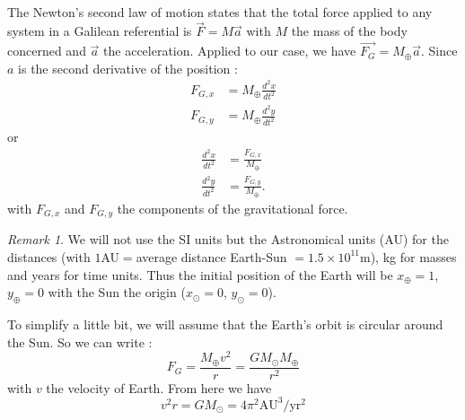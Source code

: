 \documentclass[a4paper, twoside, 11pt]{report}
\theoremstyle{theorem}
\theoremstyle{remark}
\newtheorem{remark}{Remark}[chapter]
\theoremstyle{exemple}
\begin{document}
            \paragraph{}The Newton's second law of motion states that the total force applied to any system in a Galilean referential is $\overrightarrow{F}=M\overrightarrow{a}$ with $M$ the mass of the body concerned and $\overrightarrow {a}$ the acceleration. Applied to our case, we have $\overrightarrow{{F}_{G}} = {M}_{\oplus} \overrightarrow{a}$. Since $a$ is the second derivative of the position : 
                \begin{align*}
                    F_{G,x} &= M_{\oplus} \frac{d^2 x}{dt^2} \\
                    F_{G,y} &= M_{\oplus} \frac{d^2 y}{dt^2}
                \end{align*}
            or
                \begin{align}
                    \frac{d^2 x}{dt^2} &= \frac{F_{G,x}}{M_{\oplus}} \tag{2}\\
                    \frac{d^2 y}{dt^2} &= \frac{F_{G,y}}{M_{\oplus}} \tag{3}.
                \end{align}
            with $F_{G,x}$ and $F_{G,y}$ the components of the gravitational force.\\
            \begin{remark}
            	We will not use the SI units but the Astronomical units (AU) for the distances (with $1$AU$=$average distance Earth-Sun $=1.5 \times 10^{11}$m), kg for masses and years for time units. Thus the initial position of the Earth will be $x_{\oplus} = 1$, \hspace{0,1cm}$y_{\oplus} = 0$ with the Sun the origin ($x_{\odot} = 0$, $y_{\odot} = 0$). 

			\end{remark}
            To simplify a little bit, we will assume that the Earth's orbit is circular around the Sun. So we can write :
                \begin{equation}
                    F_G = \frac{M_{\oplus} v^2}{r} = \frac{GM_{\odot}M_{\oplus}}{r^2}
                    \tag{4}
                \end{equation}
            with $v$ the velocity of Earth. From here we have
                \begin{equation*}
                    v^2 r = GM_{\odot} = 4 \pi^2 \mathrm{AU}^3 / \mathrm{yr}^2
                    \tag{5}
                \end{equation*}
            
\end{document}
